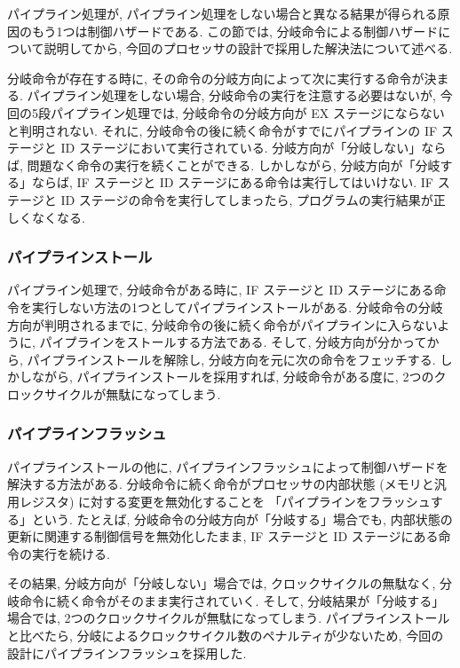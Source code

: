 \documentclass[../specifications.tex]{subfiles}
\begin{document}
  パイプライン処理が, 
  パイプライン処理をしない場合と異なる結果が得られる原因のもう1つは制御ハザードである.
  この節では, 分岐命令による制御ハザードについて説明してから, 
  今回のプロセッサの設計で採用した解決法について述べる.

  分岐命令が存在する時に, その命令の分岐方向によって次に実行する命令が決まる.
  パイプライン処理をしない場合, 分岐命令の実行を注意する必要はないが, 
  今回の5段パイプライン処理では, 分岐命令の分岐方向が EX ステージにならないと判明されない.
  それに, 分岐命令の後に続く命令がすでにパイプラインの IF ステージと ID ステージにおいて実行されている.
  分岐方向が「分岐しない」ならば, 問題なく命令の実行を続くことができる.
  しかしながら, 分岐方向が「分岐する」ならば, IF ステージと ID ステージにある命令は実行してはいけない.
  IF ステージと ID ステージの命令を実行してしまったら, プログラムの実行結果が正しくなくなる.

  \subsubsection{パイプラインストール}
  パイプライン処理で, 分岐命令がある時に, 
  IF ステージと ID ステージにある命令を実行しない方法の1つとしてパイプラインストールがある.
  分岐命令の分岐方向が判明されるまでに, 分岐命令の後に続く命令がパイプラインに入らないように, 
  パイプラインをストールする方法である.
  そして, 分岐方向が分かってから, パイプラインストールを解除し, 
  分岐方向を元に次の命令をフェッチする.
  しかしながら, パイプラインストールを採用すれば, 分岐命令がある度に,
  2つのクロックサイクルが無駄になってしまう.

  \subsubsection{パイプラインフラッシュ}
  パイプラインストールの他に, パイプラインフラッシュによって制御ハザードを解決する方法がある.
  分岐命令に続く命令がプロセッサの内部状態 (メモリと汎用レジスタ) に対する変更を無効化することを
  「パイプラインをフラッシュする」という.
  たとえば, 分岐命令の分岐方向が「分岐する」場合でも, 
  内部状態の更新に関連する制御信号を無効化したまま, 
  IF ステージと ID ステージにある命令の実行を続ける.

  その結果, 分岐方向が「分岐しない」場合では, クロックサイクルの無駄なく, 
  分岐命令に続く命令がそのまま実行されていく.
  そして, 分岐結果が「分岐する」場合では, 2つのクロックサイクルが無駄になってしまう.
  パイプラインストールと比べたら, 分岐によるクロックサイクル数のペナルティが少ないため, 
  今回の設計にパイプラインフラッシュを採用した.
\end{document}
